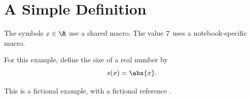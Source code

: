 \section{A Simple Definition}
\label{sec:basics}

The symbols $x \in \R$ use a shared macro. The value $7$ uses a
notebook-specific macro.

\begin{definition}[A demonstration]
\label{defn:example}
For this example, define the size of a real number by
\begin{equation}
  s(x) = \abs{x}.
  \label{eq:size}
\end{equation}
\end{definition}

This is a fictional example, with a fictional reference \citep{example-notebook}.

